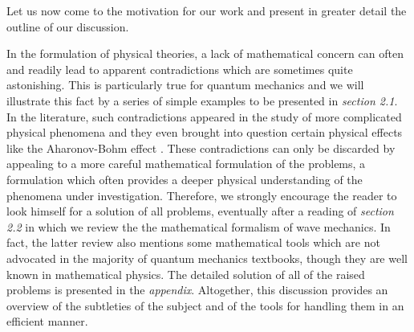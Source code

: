 \documentclass[a4wide,12pt]{report}
\begin{document}
Let us now come to the motivation for our work and 
present in greater detail the outline of our discussion. 

\bigskip 


\medskip 

In the formulation of physical theories, 
a lack of mathematical concern can 
often and readily lead to apparent
contradictions which are sometimes quite 
astonishing. This is particularly true for quantum mechanics 
and we will illustrate this fact by 
a series of simple examples to be presented in {\em section 2.1}.   
In the literature, such contradictions appeared in the study 
of more complicated physical phenomena and they even brought into 
question certain physical effects like the Aharonov-Bohm
effect \cite{ab}.
These contradictions can only
be discarded by appealing to a more careful mathematical
formulation of the problems, a formulation which
often provides a deeper physical understanding
of the phenomena under investigation.
Therefore, we strongly encourage the reader to look himself 
for a solution 
of all problems, eventually after a reading of  
{\em section 2.2} in which we review the 
the mathematical formalism of wave mechanics. 
In fact, the latter review also mentions some 
mathematical tools 
which are not advocated in the majority of
 quantum mechanics textbooks, though they are 
well known in mathematical 
 physics. 
The detailed solution of all of the raised problems
 is presented in the {\em appendix}.
Altogether, this discussion 
provides an overview of the subtleties 
of the subject and of the tools for handling them 
in an efficient manner.

\bigskip 


\medskip 
\end{document}
